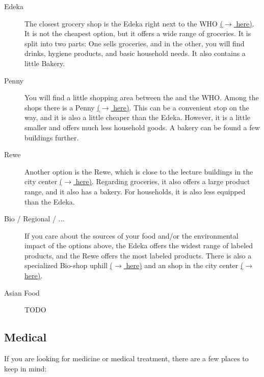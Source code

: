 \begin{description}
    \item[Edeka]
    The closest grocery shop is the Edeka right next to the WHO \href{https://maps.app.goo.gl/DTd9KutteiG8m5L1A}{($\xrightarrow{}$ here)}. It is not the cheapest option, but it offers a wide range of groceries. It is split into two parts: One sells groceries, and in the other, you will find drinks, hygiene products, and basic household needs. It also contains a little Bakery.
    
    \item[Penny]
    You will find a little shopping area between the  and the WHO. Among the shops there is a Penny \href{https://maps.app.goo.gl/7F1s1fUtsefv49gv8}{($\xrightarrow{}$ here)}. This can be a convenient stop on the way, and it is also a little cheaper than the Edeka. However, it is a little smaller and offers much less household goods. A bakery can be found a few buildings further.

    \item[Rewe]
    Another  option is the Rewe, which is close to the lecture buildings in the city center \href{https://maps.app.goo.gl/Sj6d82QsJSTaGCuv5}{($\xrightarrow{}$ here)}. Regarding groceries, it also offers a large product range, and it also has a bakery. For households, it is also less equipped than the Edeka.

    \item[Bio / Regional / ...]
    If you care about the sources of your food and/or the environmental impact of the options above, the Edeka offers the widest range of  labeled products, and the Rewe offers the most  labeled products. There is also a specialized Bio-shop uphill \href{https://maps.app.goo.gl/EEEsyTK1hGbJ5H1B6}{($\xrightarrow{}$ here)} and an  shop in the city center \href{https://maps.app.goo.gl/8ppTPAT6ZfP2TXeg6}{($\xrightarrow{}$ here)}.

    \item[Asian Food]
    {\color{darkred} TODO}
\end{description}

\subsection{Medical}
If you are looking for medicine or medical treatment, there are a few places to keep in mind:

